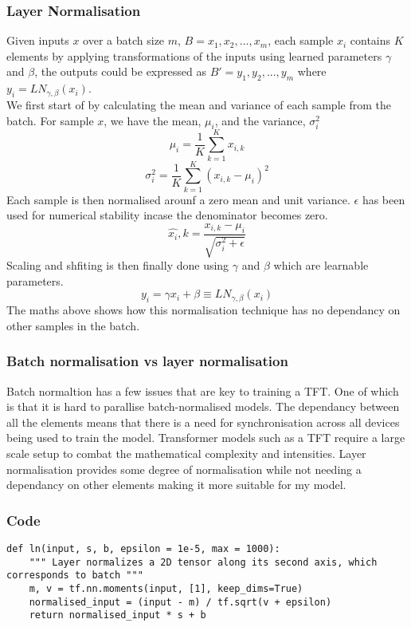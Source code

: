 \documentclass{article}
\begin{document}
\subsubsection{Layer Normalisation}


Given inputs $x$ over a batch size $m$, $B = {x_1,x_2, ..., x_m}$, each sample $x_i$ contains $K$ elements by applying transformations of the inputs using learned parameters
$\gamma$ and $\beta$, the outputs could be expressed as $B' = {y_1,y_2,...,y_m}$ where
$y_i=LN_{\gamma,\beta}(x_i)$. \\
We first start of by calculating the mean and variance of each sample from the batch.
For sample $x$, we have the mean, $\mu_i$, and the variance, $\sigma_i^2$
$$\mu_i = \frac{1}{K}\sum^K_{k=1}x_{i,k}$$
$$\sigma_i^2 = \frac{1}{K}\sum^K_{k=1}(x_{i,k}-\mu_i)^2$$
Each sample is then normalised arounf a zero mean and unit variance. $\epsilon$ has been used for numerical stability incase the denominator becomes zero.
$$\hat{x_i},k= \frac{x_{i,k}-\mu_i}{\sqrt{\sigma_i^2+\epsilon}}$$
Scaling and shfiting is then finally done using $\gamma$ and $\beta$ which are learnable parameters.
$$y_i = \gamma \hat{x_i}+\beta \equiv LN_{\gamma,\beta}(x_i)$$
The maths above shows how this normalisation technique has no dependancy on other samples in the batch.
\subsubsection{Batch normalisation vs layer normalisation}
Batch normaltion has a few issues that are key to training a TFT. One of which is that
it is hard to parallise batch-normalised models. The dependancy between all the elements
 means that there is a need for synchronisation across all devices being used to train the model. Transformer models such as a TFT require a large scale setup to combat the
 mathematical complexity and intensities. Layer normalisation provides some degree of
 normalisation while not needing a dependancy on other elements making it more suitable
 for my model.
\subsubsection{Code}
\begin{lstlisting}
def ln(input, s, b, epsilon = 1e-5, max = 1000):
    """ Layer normalizes a 2D tensor along its second axis, which corresponds to batch """
    m, v = tf.nn.moments(input, [1], keep_dims=True)
    normalised_input = (input - m) / tf.sqrt(v + epsilon)
    return normalised_input * s + b
\end{lstlisting}
\clearpage
\end{document}
